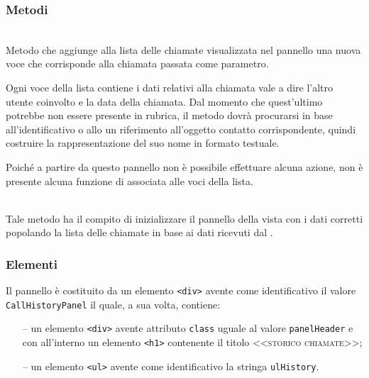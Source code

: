 \subsubsection*{Metodi}
\begin{description}

  \item{}\\
  Metodo che aggiunge alla lista delle chiamate visualizzata nel pannello una nuova voce che corrisponde alla chiamata passata come parametro.
  
  Ogni voce della lista contiene i dati relativi alla chiamata vale a dire l'altro utente coinvolto e la data della chiamata. Dal momento che quest'ultimo potrebbe non essere presente in rubrica, il metodo dovrà procurarsi in base all'identificativo o allo  un riferimento all'oggetto contatto corrispondente, quindi costruire la rappresentazione del suo nome in formato testuale.
  
  Poiché a partire da questo pannello non è possibile effettuare alcuna azione, non è presente alcuna funzione di  associata alle voci della lista.
  
  \item{}\\
  Tale metodo ha il compito di inizializzare il pannello della vista con i dati corretti popolando la lista delle chiamate in base ai dati ricevuti dal .
  
\end{description}

\subsubsection*{Elementi}
Il pannello è costituito da un elemento \verb'<div>' avente come identificativo il valore \verb'CallHistoryPanel' il quale, a sua volta, contiene:
\begin{itemize}
  \item[--] un elemento \verb'<div>' avente attributo \verb'class' uguale al valore \verb'panelHeader' e con all'interno un elemento \verb'<h1>' contenente il titolo \textsc{<<storico chiamate>>};
  \item[--] un elemento \verb'<ul>' avente come identificativo la stringa \verb'ulHistory'.
\end{itemize}


